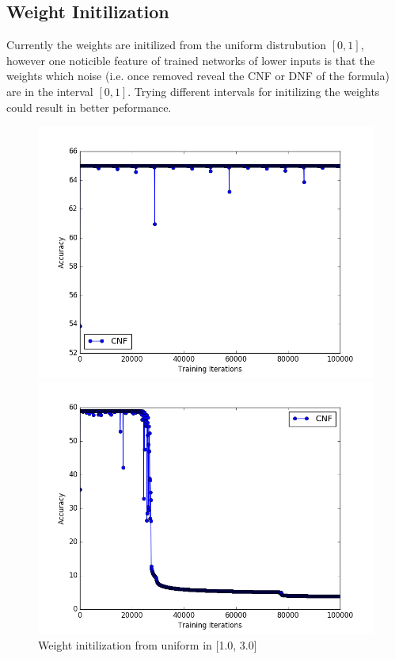 \documentclass{article}
\theoremstyle{definition}
\begin{document}
\subsection{Weight Initilization}
Currently the weights are initilized from the uniform distrubution $[0,1]$, however one noticible feature of trained networks of lower inputs is that the weights which noise (i.e. once removed reveal the CNF or DNF of the formula) are in the interval $[0,1]$. Trying different intervals for initilizing the weights could result in better peformance.

\begin{figure}[H]
\centering
  \begin{minipage}[b]{0.4\textwidth}
    \includegraphics[width=\textwidth]{CNF-LD-WI-01.png}
    \caption{Weight initilization from uniform in [1.0, 3.0]}
  \end{minipage}
  \hfill
  \begin{minipage}[b]{0.4\textwidth}
    \includegraphics[width=\textwidth]{CNF-LD-WI-02.png}

\end{minipage}
\end{figure}
\end{document}
